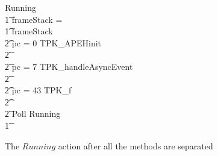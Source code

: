 
\begin{figure}[tp!]
  \setlength{\zedindent}{0cm}
  \setlength{\zedtab}{0.3cm}
  \setlength{\zedleftsep}{0cm}
  \setlength{\abovedisplayskip}{0cm}
  \setlength{\belowdisplayskip}{0cm}
  \small
  \begin{circus}
    Running \circdef \\
    \t1 \circif frameStack = \emptyset \circthen \Skip \\
    \t1 {} \circelse frameStack \neq \emptyset \circthen {} \\
    \t2 {} \circif pc = 0 \circthen TPK\_APEHinit \\
    \t2 {} \cdots {} \\
    \t2 {} \circelse pc = 7 \circthen TPK\_handleAsyncEvent \\
    \t2 {} \cdots {} \\
    \t2 {} \circelse pc = 43 \circthen TPK\_f \\
    \t2 {} \cdots {} \\
    \t2 \circfi \circseq Poll \circseq Running \\
    \t1 \circfi
  \end{circus}
  \caption{The $Running$ action after all the methods are separated}
  \label{final-method-separation-example-figure}
\end{figure}


